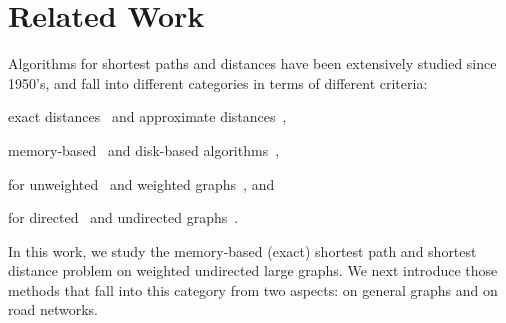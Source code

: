 \section{Related Work}
\label{sec-related}

Algorithms for shortest  paths and distances have been extensively studied since 1950's, and fall into different categories in terms of different criteria:

 \bi
 \item exact distances~\cite{WuXDCZZ12,Dijkstra59,FredmanT84,LubyR89,GeisbergerSSD08,SankaranarayananSA09,SandersS05,GoldbergH05,MozesS12,ChengKCC12,MozesS12,ChanL07,SaundersT07,WagnerW07,bast2014route,delling2014robust,arz2013transit,zhu2013shortest,klein2010shortest,fakcharoenphol2006planar,gupta2004roads}
     and approximate distances~\cite{PotamiasBCG09,SarmaGNP10,ThorupZ05,SankaranarayananS10},


 \item memory-based~\cite{PotamiasBCG09,SarmaGNP10,WuXDCZZ12,Dijkstra59,FredmanT84,LubyR89,GeisbergerSSD08,Wei10,SankaranarayananSA09,SandersS05,
ThorupZ05,MozesS12,SaundersT07,WagnerW07,bast2014route,delling2014robust,arz2013transit,SankaranarayananS10,zhu2013shortest,klein2010shortest,gupta2004roads} and disk-based algorithms~\cite{ChengKCC12,ChanL07},


 \item for unweighted~\cite{PotamiasBCG09,SarmaGNP10,Wei10,bast2014route,delling2014robust,arz2013transit} and weighted graphs~\cite{WuXDCZZ12,Dijkstra59,FredmanT84,LubyR89,GeisbergerSSD08,SankaranarayananSA09,GoldbergH05,MozesS12,SandersS05,ChengKCC12,ThorupZ05,MozesS12,ChanL07,SaundersT07,WagnerW07,bast2014route,delling2014robust,arz2013transit,SankaranarayananS10,zhu2013shortest,klein2010shortest,fakcharoenphol2006planar,gupta2004roads},
     and


 \item for directed~\cite{SaundersT07,GoldbergH05,MozesS12,bast2014route,delling2014robust,arz2013transit,zhu2013shortest,klein2010shortest,fakcharoenphol2006planar} and undirected graphs~\cite{PotamiasBCG09,SarmaGNP10,WuXDCZZ12,Dijkstra59,FredmanT84,LubyR89,GeisbergerSSD08,Wei10,SankaranarayananSA09,SandersS05,ChengKCC12,ThorupZ05,MozesS12,ChanL07,WagnerW07,bast2014route,delling2014robust,arz2013transit,SankaranarayananS10,gupta2004roads}.
 \ei


In this work, we study the memory-based (exact) shortest path and shortest distance problem on weighted undirected large graphs. 
%
We next introduce those methods that fall into this category from two aspects: on general graphs and on road networks.

